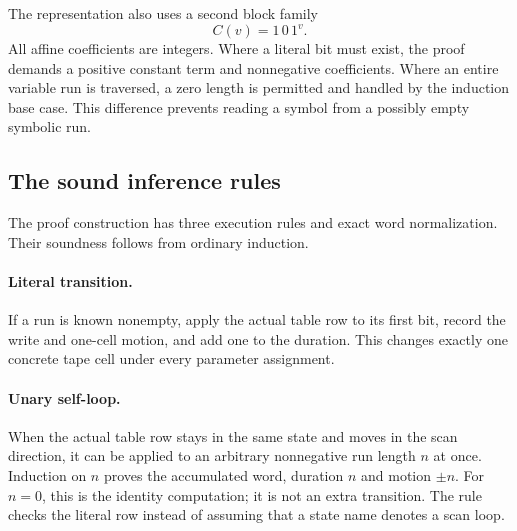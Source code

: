 The representation also uses a second block family
\[
                        C(v)=1\,0\,1^v.
\]
All affine coefficients are integers. Where a literal bit must exist,
the proof demands a positive constant term and nonnegative coefficients.
Where an entire variable run is traversed, a zero length is permitted and
handled by the induction base case. This difference prevents reading a
symbol from a possibly empty symbolic run.

\subsection{The sound inference rules}

The proof construction has three execution rules and exact word
normalization. Their soundness follows from ordinary induction.

\paragraph{Literal transition.}
If a run is known nonempty, apply the actual table row to its first bit,
record the write and one-cell motion, and add one to the duration. This
changes exactly one concrete tape cell under every parameter assignment.

\paragraph{Unary self-loop.}
When the actual table row stays in the same state and moves in the scan
direction, it can be applied to an arbitrary nonnegative run length $n$
at once. Induction on $n$ proves the accumulated word, duration $n$ and
motion $\pm n$. For $n=0$, this is the identity computation; it is not an
extra transition. The rule checks the literal row instead of assuming
that a state name denotes a scan loop.

